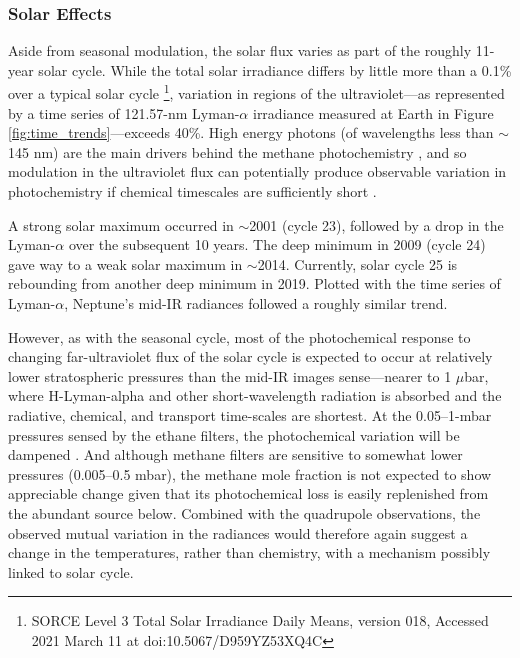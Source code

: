 \documentclass[twocolumn,10pt]{aastex631}
\begin{document}
   
\subsubsection{Solar Effects}
Aside from seasonal modulation, the solar flux varies as part of the roughly 11-year solar cycle. While the total solar irradiance differs by little more than a 0.1\% over a typical solar cycle \citep{Kopp2019solar}\footnote{SORCE Level 3 Total Solar Irradiance Daily Means, version 018, %
Accessed 2021 March 11 at doi:10.5067/D959YZ53XQ4C}, variation in regions of the ultraviolet---as represented by a time series of 121.57-nm Lyman-$\alpha$ irradiance measured at Earth in Figure \ref{fig:time_trends}---exceeds 40\%. High energy photons (of wavelengths less than $\sim$ 145 nm) are the main drivers behind the methane photochemistry \citep{moses2020icegiantchem}, and so modulation in the ultraviolet flux can potentially produce observable variation in photochemistry if chemical timescales are sufficiently short \citep{moses2005latitudinal}.  

A strong solar maximum occurred in $\sim$2001 (cycle 23), followed by a drop in the Lyman-$\alpha$ over the subsequent 10 years. The deep minimum in 2009 (cycle 24) gave way to a weak solar maximum in $\sim$2014. Currently, solar cycle 25 is rebounding from another deep minimum in 2019. Plotted with the time series of Lyman-$\alpha$, Neptune's mid-IR radiances followed a roughly similar trend. 

However, as with the seasonal cycle, most of the photochemical response to changing far-ultraviolet flux of the solar cycle is expected to occur at relatively lower stratospheric pressures than the mid-IR images sense---nearer to 1 $\mu$bar, where H-Lyman-alpha and other short-wavelength radiation is absorbed and the radiative, chemical, and transport time-scales are shortest. At the 0.05--1-mbar pressures sensed by the ethane filters, the photochemical variation will be dampened \citep{moses2018seasonal}. And although methane filters are sensitive to somewhat lower pressures (0.005--0.5 mbar), the methane mole fraction is not expected to show appreciable change given that its photochemical loss is easily replenished from the abundant source below. Combined with the quadrupole observations, the observed mutual variation in the radiances would therefore again suggest a change in the temperatures, rather than chemistry, with a mechanism possibly linked to solar cycle.   
\end{document}

